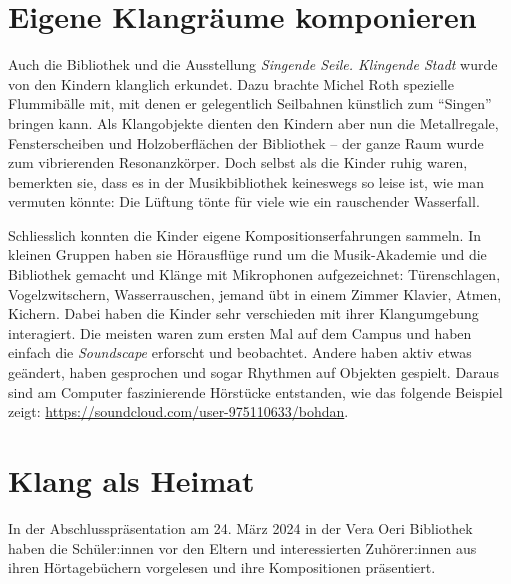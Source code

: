 \documentclass[a4paper,
fontsize=11pt,
oneside,
numbers=noperiodatend,
parskip=half-,
bibliography=totoc,
final
]{scrartcl}
\begin{document}
\hypertarget{eigene-klangruxe4ume-komponieren}{%
\section{Eigene Klangräume
komponieren}\label{eigene-klangruxe4ume-komponieren}}

Auch die Bibliothek und die Ausstellung \emph{Singende Seile. Klingende
Stadt} wurde von den Kindern klanglich erkundet. Dazu brachte Michel
Roth spezielle Flummibälle mit, mit denen er gelegentlich Seilbahnen
künstlich zum \enquote{Singen} bringen kann. Als Klangobjekte dienten
den Kindern aber nun die Metallregale, Fensterscheiben und
Holzoberflächen der Bibliothek -- der ganze Raum wurde zum vibrierenden
Resonanzkörper. Doch selbst als die Kinder ruhig waren, bemerkten sie,
dass es in der Musikbibliothek keineswegs so leise ist, wie man vermuten
könnte: Die Lüftung tönte für viele wie ein rauschender Wasserfall.

Schliesslich konnten die Kinder eigene Kompositionserfahrungen sammeln.
In kleinen Gruppen haben sie Hörausflüge rund um die Musik-Akademie und
die Bibliothek gemacht und Klänge mit Mikrophonen aufgezeichnet:
Türenschlagen, Vogelzwitschern, Wasserrauschen, jemand übt in einem
Zimmer Klavier, Atmen, Kichern. Dabei haben die Kinder sehr verschieden
mit ihrer Klangumgebung interagiert. Die meisten waren zum ersten Mal
auf dem Campus und haben einfach die \emph{Soundscape} erforscht und
beobachtet. Andere haben aktiv etwas geändert, haben gesprochen und
sogar Rhythmen auf Objekten gespielt. Daraus sind am Computer
faszinierende Hörstücke entstanden, wie das folgende Beispiel zeigt:
\url{https://soundcloud.com/user-975110633/bohdan}.

\hypertarget{klang-als-heimat}{%
\section{Klang als Heimat}\label{klang-als-heimat}}

In der Abschlusspräsentation am 24. März 2024 in der Vera Oeri
Bibliothek haben die Schüler:innen vor den Eltern und interessierten
Zuhörer:innen aus ihren Hörtagebüchern vorgelesen und ihre Kompositionen
präsentiert.
\end{document}
